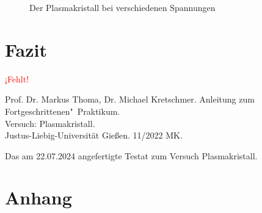 \documentclass[12pt,a4paper,ngerman]{report}
\providecommand{\fehlt}{\textcolor{red}{{ ¡Fehlt! }}}
\begin{document}
\begin{figure}
		\caption{Der Plasmakristall bei verschiedenen Spannungen}
		\label{fig:Druckabnahme}
	\end{figure}

\chapter{Fazit}
	\fehlt

\listoffigures%
	
\begin{thebibliography}{111}%
	Prof. Dr. Markus Thoma, Dr. Michael Kretschmer. Anleitung zum Fortgeschrittenen"~Praktikum.\\ \glqq Versuch: Plasmakristall\grqq.\\ Justus-Liebig-Universität Gießen. 11/2022 MK.
	
		Das am 22.07.2024 angefertigte Testat zum Versuch \glqq Plasmakristall\grqq.
	\end{thebibliography}


\chapter*{Anhang}\label{ch:Anhang}
\FloatBarrier
\end{document}
